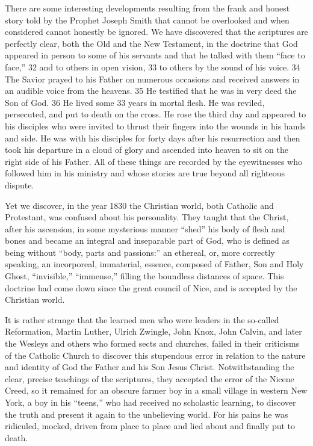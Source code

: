 There are some interesting developments resulting from the frank and honest story told by
the Prophet Joseph Smith that cannot be overlooked and when considered cannot honestly be
ignored. We have discovered that the scriptures are perfectly clear, both the Old and the New
Testament, in the doctrine that God appeared in person to some of his servants and that he
talked with them ``face to face,'' 32 and to others in open vision, 33 to others by the sound of
his voice. 34 The Savior prayed to his Father on numerous occasions and received answers in
an audible voice from the heavens. 35 He testified that he was in very deed the Son of God.
36 He lived some 33 years in mortal flesh. He was reviled, persecuted, and put to death on
the cross. He rose the third day and appeared to his disciples who were invited to thrust their
fingers into the wounds in his hands and side. He was with his disciples for forty days after
his resurrection and then took his departure in a cloud of glory and ascended into heaven to
sit on the right side of his Father. All of these things are recorded by the eyewitnesses who
followed him in his ministry and whose stories are true beyond all righteous dispute.

Yet we discover, in the year 1830 the Christian world, both Catholic and Protestant, was
confused about his personality. They taught that the Christ, after his ascension, in some
mysterious manner ``shed'' his body of flesh and bones and became an integral and
inseparable part of God, who is defined as being without ``body, parts and passions:'' an
ethereal, or, more correctly speaking, an incorporeal, immaterial, essence, composed of
Father, Son and Holy Ghost, ``invisible,'' ``immense,'' filling the boundless distances of space.
This doctrine had come down since the great council of Nice, and is accepted by the
Christian world.

It is rather strange that the learned men who were leaders in the so-called Reformation,
Martin Luther, Ulrich Zwingle, John Knox, John Calvin, and later the Wesleys and others
who formed sects and churches, failed in their criticisms of the Catholic Church to discover
this stupendous error in relation to the nature and identity of God the Father and his Son
Jesus Christ. Notwithstanding the clear, precise teachings of the scriptures, they accepted the
error of the Nicene Creed, so it remained for an obscure farmer boy in a small village in
western New York, a boy in his ``teens,'' who had received no scholastic learning, to discover
the truth and present it again to the unbelieving world. For his pains he was ridiculed,
mocked, driven from place to place and lied about and finally put to death.

